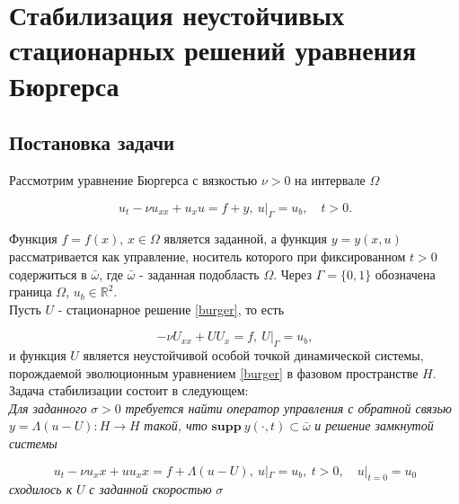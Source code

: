 \chapter{Стабилизация неустойчивых стационарных решений уравнения Бюргерса}


\section{Постановка задачи}
\vspace{1em}

Рассмотрим уравнение Бюргерса с вязкостью $\nu > 0$ на интервале $\Omega$

\begin{equation}\label{burger}
    u_t - \nu u_{xx} + u_x u = f + y, \ u|_{\Gamma} = u_b, \quad t > 0.
\end{equation}

Функция $f = f(x)$, $x \in \Omega$ является заданной, а функция $y = y(x, u)$
рассматривается как управление, носитель которого при фиксированном $t > 0$
содержиться в $\bar{\omega}$, где $\bar{\omega}$ - заданная подобласть $\Omega$.
Через $\Gamma = \{0, 1\}$ обозначена граница $\Omega$, $u_b \in \mathbb{R}^2$.\\

Пусть $U$ - стационарное решение \eqref{burger}, то есть

\begin{equation}\label{stationary_sol}
    -\nu U_{xx} + U U_x = f, \ U|_{\Gamma} = u_b,
\end{equation}
и функция $U$ является неустойчивой особой точкой динамической системы, порождаемой
эволюционным уравнением \eqref{burger} в фазовом пространстве $H$.
Задача стабилизации состоит в следующем:\\

\textit{Для заданного} $\sigma > 0$ 
\textit{требуется найти оператор управления с обратной связью} 
$y = \Lambda(u - U) : H \to H$ \textit{такой, что} $\mathbf{supp} \ y (\cdot,t) \subset 
\bar{\omega}$ \textit{и решение замкнутой системы}

\begin{equation}
    u_t - \nu u_xx + u u_xx = f + \Lambda(u - U), \ u|_{\Gamma} = u_b,
    \ t > 0, \quad u|_{t=0} = u_0
\end{equation}
\textit{сходилось к} $U$ \textit{с заданной скоростью} $\sigma$

